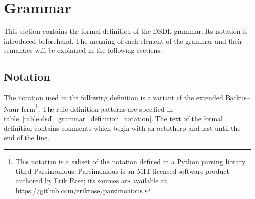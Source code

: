 \section{Grammar}\label{sec:dsdl_grammar}

This section contains the formal definition of the DSDL grammar.
Its notation is introduced beforehand.
The meaning of each element of the grammar and their semantics will be explained in the following sections.

\subsection{Notation}

The notation used in the following definition is a variant of the extended Backus--Naur
form\footnote{%
    This notation is a subset of the notation defined in a Python parsing library titled Parsimonious.
    Parsimonious is an MIT-licensed software product authored by Erik Rose;
    its sources are available at \url{https://github.com/erikrose/parsimonious}.
}.
The rule definition patterns are specified in table~\ref{table:dsdl_grammar_definition_notation}.
The text of the formal definition contains comments which begin with an octothorp and last until the end of the line.

